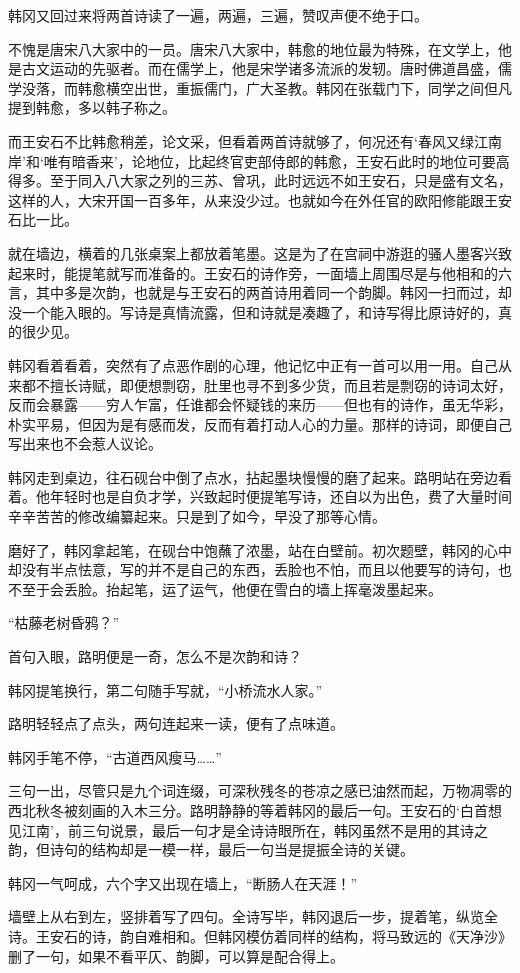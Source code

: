 韩冈又回过来将两首诗读了一遍，两遍，三遍，赞叹声便不绝于口。

不愧是唐宋八大家中的一员。唐宋八大家中，韩愈的地位最为特殊，在文学上，他是古文运动的先驱者。而在儒学上，他是宋学诸多流派的发轫。唐时佛道昌盛，儒学没落，而韩愈横空出世，重振儒门，广大圣教。韩冈在张载门下，同学之间但凡提到韩愈，多以韩子称之。

而王安石不比韩愈稍差，论文采，但看着两首诗就够了，何况还有‘春风又绿江南岸’和‘唯有暗香来’，论地位，比起终官吏部侍郎的韩愈，王安石此时的地位可要高得多。至于同入八大家之列的三苏、曾巩，此时远远不如王安石，只是盛有文名，这样的人，大宋开国一百多年，从来没少过。也就如今在外任官的欧阳修能跟王安石比一比。

就在墙边，横着的几张桌案上都放着笔墨。这是为了在宫祠中游逛的骚人墨客兴致起来时，能提笔就写而准备的。王安石的诗作旁，一面墙上周围尽是与他相和的六言，其中多是次韵，也就是与王安石的两首诗用着同一个韵脚。韩冈一扫而过，却没一个能入眼的。写诗是真情流露，但和诗就是凑趣了，和诗写得比原诗好的，真的很少见。

韩冈看着看着，突然有了点恶作剧的心理，他记忆中正有一首可以用一用。自己从来都不擅长诗赋，即便想剽窃，肚里也寻不到多少货，而且若是剽窃的诗词太好，反而会暴露——穷人乍富，任谁都会怀疑钱的来历——但也有的诗作，虽无华彩，朴实平易，但因为是有感而发，反而有着打动人心的力量。那样的诗词，即便自己写出来也不会惹人议论。

韩冈走到桌边，往石砚台中倒了点水，拈起墨块慢慢的磨了起来。路明站在旁边看着。他年轻时也是自负才学，兴致起时便提笔写诗，还自以为出色，费了大量时间辛辛苦苦的修改编纂起来。只是到了如今，早没了那等心情。

磨好了，韩冈拿起笔，在砚台中饱蘸了浓墨，站在白壁前。初次题壁，韩冈的心中却没有半点怯意，写的并不是自己的东西，丢脸也不怕，而且以他要写的诗句，也不至于会丢脸。抬起笔，运了运气，他便在雪白的墙上挥毫泼墨起来。

“枯藤老树昏鸦？”

首句入眼，路明便是一奇，怎么不是次韵和诗？

韩冈提笔换行，第二句随手写就，“小桥流水人家。”

路明轻轻点了点头，两句连起来一读，便有了点味道。

韩冈手笔不停，“古道西风瘦马……”

三句一出，尽管只是九个词连缀，可深秋残冬的苍凉之感已油然而起，万物凋零的西北秋冬被刻画的入木三分。路明静静的等着韩冈的最后一句。王安石的‘白首想见江南’，前三句说景，最后一句才是全诗诗眼所在，韩冈虽然不是用的其诗之韵，但诗句的结构却是一模一样，最后一句当是提振全诗的关键。

韩冈一气呵成，六个字又出现在墙上，“断肠人在天涯！”

墙壁上从右到左，竖排着写了四句。全诗写毕，韩冈退后一步，提着笔，纵览全诗。王安石的诗，韵自难相和。但韩冈模仿着同样的结构，将马致远的《天净沙》删了一句，如果不看平仄、韵脚，可以算是配合得上。

